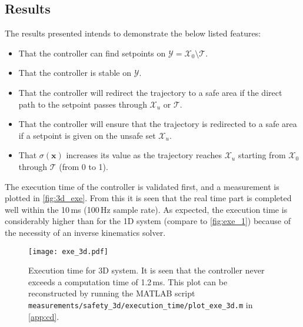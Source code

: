 \subsection{Results}
The results presented intends to demonstrate the below listed features:
\vspace{-3mm}
\begin{itemize}
	\itemsep-0.6mm
\item That the controller can find setpoints on $\mathcal{Y}=\mathcal{X}_0\setminus\mathcal{T}$.
\item That the controller is stable on $\mathcal{Y}$.
\item That the controller will redirect the trajectory to a safe area if the direct path to the setpoint passes through $\mathcal{X}_u$ or $\mathcal{T}$.
\item That the controller will ensure that the trajectory is redirected to a safe area if a setpoint is given on the unsafe set $\mathcal{X}_u$.
\item That $\sigma (\textbf{x})$ increases its value as the trajectory reaches $\mathcal{X}_u$ starting from $\mathcal{X}_0$ through $\mathcal{T}$ (from 0 to 1).
\end{itemize}

The execution time of the controller is validated first, and a measurement is plotted in \autoref{fig:3d_exe}. From this it is seen that the real time part is completed well within the 10\,ms (100\,Hz sample rate). As expected, the execution time is considerably higher than for the 1D system (compare to \autoref{fig:exe_1}) because of the necessity of an inverse kinematics solver.

\begin{figure}[h]
	\texttt{[image: exe\_3d.pdf]}
	\caption{Execution time for 3D system. It is seen that the controller never exceeds a computation time of 1.2\,ms. This plot can be reconstructed by running the MATLAB script \texttt{measurements/safety\_3d/execution\_time/plot\_exe\_3d.m} in \autoref{app:cd}.}
	\label{fig:3d_exe}
\end{figure}

